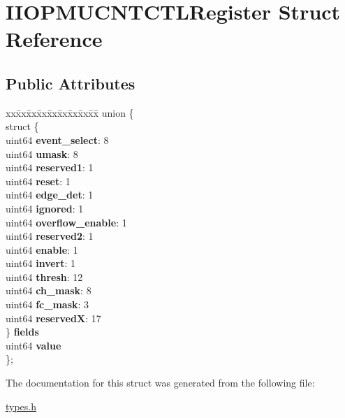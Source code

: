 \hypertarget{struct_i_i_o_p_m_u_c_n_t_c_t_l_register}{}\section{I\+I\+O\+P\+M\+U\+C\+N\+T\+C\+T\+L\+Register Struct Reference}
\label{struct_i_i_o_p_m_u_c_n_t_c_t_l_register}
\subsection*{Public Attributes}
\begin{DoxyCompactItemize}
\item 
\mbox{\label{struct_i_i_o_p_m_u_c_n_t_c_t_l_register_a7e53e8eb9f81e19a742cd30a5b6bca7b}} 
\begin{tabbing}
xx\=xx\=xx\=xx\=xx\=xx\=xx\=xx\=xx\=\kill
union \{\\
\>struct \{\\
\>\>uint64 {\bfseries event\_select}: 8\\
\>\>uint64 {\bfseries umask}: 8\\
\>\>uint64 {\bfseries reserved1}: 1\\
\>\>uint64 {\bfseries reset}: 1\\
\>\>uint64 {\bfseries edge\_det}: 1\\
\>\>uint64 {\bfseries ignored}: 1\\
\>\>uint64 {\bfseries overflow\_enable}: 1\\
\>\>uint64 {\bfseries reserved2}: 1\\
\>\>uint64 {\bfseries enable}: 1\\
\>\>uint64 {\bfseries invert}: 1\\
\>\>uint64 {\bfseries thresh}: 12\\
\>\>uint64 {\bfseries ch\_mask}: 8\\
\>\>uint64 {\bfseries fc\_mask}: 3\\
\>\>uint64 {\bfseries reservedX}: 17\\
\>\} {\bfseries fields}\\
\>uint64 {\bfseries value}\\
\}; \\

\end{tabbing}\end{DoxyCompactItemize}


The documentation for this struct was generated from the following file\+:\begin{DoxyCompactItemize}
\item 
\mbox{\hyperlink{types_8h}{types.\+h}}\end{DoxyCompactItemize}
